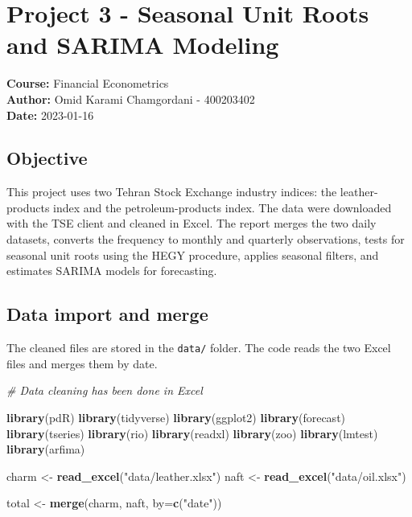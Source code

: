 \documentclass[
  11pt,
]{article}
\author{}
\date{}
\newenvironment{Shaded}{\begin{snugshade}}{\end{snugshade}}
\newcommand{\AttributeTok}[1]{\textcolor[rgb]{0.13,0.29,0.53}{#1}}
\newcommand{\CommentTok}[1]{\textcolor[rgb]{0.56,0.35,0.01}{\textit{#1}}}
\newcommand{\FunctionTok}[1]{\textcolor[rgb]{0.13,0.29,0.53}{\textbf{#1}}}
\newcommand{\NormalTok}[1]{#1}
\newcommand{\OtherTok}[1]{\textcolor[rgb]{0.56,0.35,0.01}{#1}}
\newcommand{\StringTok}[1]{\textcolor[rgb]{0.31,0.60,0.02}{#1}}
\begin{document}
{
\setcounter{tocdepth}{3}
\tableofcontents
}
\section{Project 3 - Seasonal Unit Roots and SARIMA
Modeling}\label{project-3---seasonal-unit-roots-and-sarima-modeling}

\textbf{Course:} Financial Econometrics\\
\textbf{Author:} Omid Karami Chamgordani - 400203402\\
\textbf{Date:} 2023-01-16

\subsection{Objective}\label{objective}

This project uses two Tehran Stock Exchange industry indices: the
leather-products index and the petroleum-products index. The data were
downloaded with the TSE client and cleaned in Excel. The report merges
the two daily datasets, converts the frequency to monthly and quarterly
observations, tests for seasonal unit roots using the HEGY procedure,
applies seasonal filters, and estimates SARIMA models for forecasting.

\subsection{Data import and merge}\label{data-import-and-merge}

The cleaned files are stored in the \texttt{data/} folder. The code
reads the two Excel files and merges them by date.

\begin{Shaded}
\begin{Highlighting}[]
\CommentTok{\# Data cleaning has been done in Excel}

\FunctionTok{library}\NormalTok{(pdR)}
\FunctionTok{library}\NormalTok{(tidyverse)}
\FunctionTok{library}\NormalTok{(ggplot2)}
\FunctionTok{library}\NormalTok{(forecast)}
\FunctionTok{library}\NormalTok{(tseries)}
\FunctionTok{library}\NormalTok{(rio)}
\FunctionTok{library}\NormalTok{(readxl)}
\FunctionTok{library}\NormalTok{(zoo)}
\FunctionTok{library}\NormalTok{(lmtest)}
\FunctionTok{library}\NormalTok{(arfima)}

\NormalTok{charm }\OtherTok{\textless{}{-}} \FunctionTok{read\_excel}\NormalTok{(}\StringTok{"data/leather.xlsx"}\NormalTok{)}
\NormalTok{naft  }\OtherTok{\textless{}{-}} \FunctionTok{read\_excel}\NormalTok{(}\StringTok{"data/oil.xlsx"}\NormalTok{)}

\NormalTok{total }\OtherTok{\textless{}{-}} \FunctionTok{merge}\NormalTok{(charm, naft, }\AttributeTok{by=}\FunctionTok{c}\NormalTok{(}\StringTok{"date"}\NormalTok{))}
\end{Highlighting}
\end{Shaded}
\end{document}
